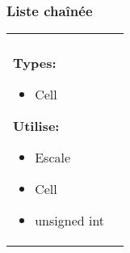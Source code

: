 \documentclass[a4paper, 11pt, oneside]{article}
\begin{document}
		\footnotetext{\textcolor{red}{Nom des opérations interne}}
		\footnotetext{\textcolor{green}{Arguments}}
		\footnotetext{\textcolor{blue}{Types de retour}}
		\footnotetext{\textcolor{magenta}{Nom des opérations d'observation}}

		\subsubsection{Liste chaînée}
			\begin{tabular}{|p{17cm}|c}
				\hline
				\\

				\textbf{Types:}
					\begin{itemize}
						\item[] Cell
					\end{itemize}

				\textbf{Utilise:}
					\begin{itemize}
						\item[] Escale
						\item[] Cell
						\item[] unsigned int
					\end{itemize}


\end{tabular}
\end{document}
